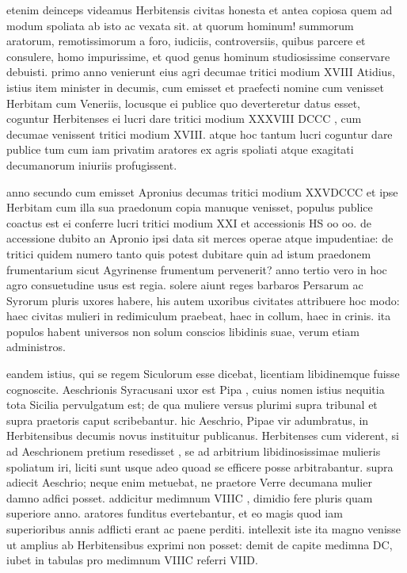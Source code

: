  etenim deinceps videamus Herbitensis civitas honesta et antea copiosa quem ad modum spoliata ab isto ac vexata sit. at quorum hominum! summorum aratorum, remotissimorum a foro, iudiciis, controversiis, quibus parcere et consulere, homo impurissime, et quod genus hominum studiosissime conservare debuisti. primo anno venierunt eius agri decumae tritici modium XVIII Atidius, istius item minister in decumis, cum emisset et praefecti nomine cum venisset Herbitam cum Veneriis, locusque ei publice quo deverteretur datus esset, coguntur Herbitenses ei lucri dare tritici modium XXXVIII DCCC , cum decumae venissent tritici modium XVIII. atque hoc tantum lucri coguntur dare publice tum cum iam privatim aratores ex agris spoliati atque exagitati decumanorum iniuriis profugissent.

 anno secundo cum emisset Apronius decumas tritici modium XXVDCCC et ipse Herbitam cum illa sua praedonum copia manuque venisset, populus publice coactus est ei conferre lucri tritici modium XXI et accessionis HS oo oo. de accessione dubito an Apronio ipsi data sit merces operae atque impudentiae: de tritici quidem numero tanto quis potest dubitare quin ad istum praedonem frumentarium sicut Agyrinense frumentum pervenerit? anno tertio vero in hoc agro consuetudine usus est regia. solere aiunt reges barbaros Persarum ac Syrorum pluris uxores habere, his autem uxoribus civitates attribuere hoc modo: haec civitas mulieri in redimiculum praebeat, haec in collum, haec in crinis. ita populos habent universos non solum conscios libidinis suae, verum etiam administros.

 eandem istius, qui se regem Siculorum esse dicebat, licentiam libidinemque fuisse cognoscite. Aeschrionis Syracusani uxor est Pipa , cuius nomen istius nequitia tota Sicilia pervulgatum est; de qua muliere versus plurimi supra tribunal et supra praetoris caput scribebantur. hic Aeschrio, Pipae vir adumbratus, in Herbitensibus decumis novus instituitur publicanus. Herbitenses cum viderent, si ad Aeschrionem pretium resedisset , se ad arbitrium libidinosissimae mulieris spoliatum iri, liciti sunt usque adeo quoad se efficere posse arbitrabantur. supra adiecit Aeschrio; neque enim metuebat, ne praetore Verre decumana mulier damno adfici posset. addicitur medimnum VIIIC , dimidio fere pluris quam superiore anno. aratores funditus evertebantur, et eo magis quod iam superioribus annis adflicti erant ac paene perditi. intellexit iste ita magno venisse ut amplius ab Herbitensibus exprimi non posset: demit de capite medimna DC, iubet in tabulas pro medimnum VIIIC referri VIID.

